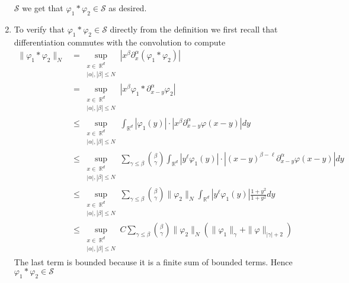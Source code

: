 \documentclass{article}
\DeclareMathOperator{\R}{\mathbb{R}}
\newcommand{\norm}[1]{\|#1\|}
\begin{document}
\begin{enumerate}
  $\mathcal{S}$ we get that $\varphi_1\ast\varphi_2 \in \mathcal{S}$
  as desired.
\item To verify that $\varphi_1 \ast \varphi_2 \in \mathcal{S}$
  directly from the definition we first recall that differentiation
  commutes with the convolution to compute
  \begin{align*}
    \norm{\varphi_1\ast \varphi_2}_N &= \sup_{\substack{x\in\R^d \\
        |\alpha|,|\beta| \leq N}}
    |x^{\beta}\partial_x^\alpha(\varphi_1\ast\varphi_2)| \\
    &= \sup_{\substack{x\in\R^d \\
        |\alpha|,|\beta| \leq N}}\left|x^\beta \varphi_1
      \ast \partial_{x-y}^\alpha\varphi_2\right| \\
    &\leq \sup_{\substack{x\in\R^d \\
        |\alpha|,|\beta| \leq N}} \int_{\R^d}
    |\varphi_1(y)|\cdot|x^\beta\partial_{x-y}^\alpha\varphi(x-y)|dy \\
    &\leq \sup_{\substack{x\in\R^d \\
        |\alpha|,|\beta| \leq N}} \sum_{\gamma \leq
      \beta}\binom{\beta}{\gamma}\int_{\R^d} |y^\ell\varphi_1(y)|\cdot
    |(x-y)^{\beta-\ell}\partial_{x-y}^\alpha\varphi(x-y)|dy \\
    &\leq \sup_{\substack{x\in\R^d \\
        |\alpha|,|\beta| \leq N}} \sum_{\gamma \leq
      \beta}\binom{\beta}{\gamma}\norm{\varphi_2}_N\int_{\R^d}
    |y^\ell\varphi_1(y)| \frac{1+y^2}{1+y^2}dy \\
    &\leq \sup_{\substack{x\in\R^d \\
        |\alpha|,|\beta| \leq N}} C\sum_{\gamma \leq
      \beta}\binom{\beta}{\gamma}\norm{\varphi_2}_N
    (\norm{\varphi_1}_{\gamma} + \norm{\varphi}_{|\gamma|+2})
  \end{align*}
  The last term is bounded because it is a finite sum of bounded
  terms. Hence $\varphi_1\ast\varphi_2 \in \mathcal{S}$
\end{enumerate}
\end{document}
